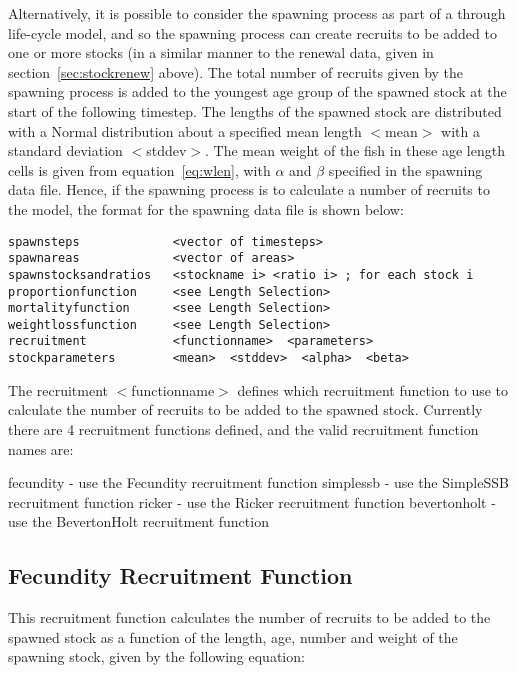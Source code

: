 \documentclass[10pt,twoside]{book}
\begin{document}
Alternatively, it is possible to consider the spawning process as part of a through life-cycle model, and so the spawning process can create recruits to be added to one or more stocks (in a similar manner to the renewal data, given in section~\ref{sec:stockrenew} above).  The total number of recruits given by the spawning process is added to the youngest age group of the spawned stock at the start of the following timestep.  The lengths of the spawned stock are distributed with a Normal distribution about a specified mean length $<$mean$>$ with a standard deviation $<$stddev$>$.  The mean weight of the fish in these age length cells is given from equation~\ref{eq:wlen}, with $\alpha$ and $\beta$ specified in the spawning data file.  Hence, if the spawning process is to calculate a number of recruits to the model, the format for the spawning data file is shown below:

{\small\begin{verbatim}
spawnsteps             <vector of timesteps>
spawnareas             <vector of areas>
spawnstocksandratios   <stockname i> <ratio i> ; for each stock i
proportionfunction     <see Length Selection>
mortalityfunction      <see Length Selection>
weightlossfunction     <see Length Selection>
recruitment            <functionname>  <parameters>
stockparameters        <mean>  <stddev>  <alpha>  <beta>
\end{verbatim}}

The recruitment $<$functionname$>$ defines which recruitment function to use to calculate the number of recruits to be added to the spawned stock.  Currently there are 4 recruitment functions defined, and the valid recruitment function names are:

\bigskip
fecundity - use the Fecundity recruitment function\newline
simplessb - use the SimpleSSB recruitment function\newline
ricker - use the Ricker recruitment function\newline
bevertonholt - use the BevertonHolt recruitment function

\subsection{Fecundity Recruitment Function}
This recruitment function calculates the number of recruits to be added to the spawned stock as a function of the length, age, number and weight of the spawning stock, given by the following equation:
\end{document}
